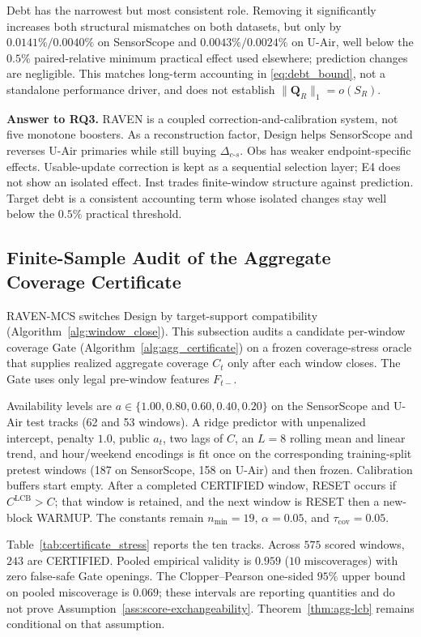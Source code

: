 \documentclass[letterpaper,journal]{IEEEtran}
\begin{document}
Debt has the narrowest but most consistent role.  Removing it significantly
increases both structural mismatches on both datasets, but only by
$0.0141\%/0.0040\%$ on SensorScope and
$0.0043\%/0.0024\%$ on U-Air, well below the $0.5\%$ paired-relative
minimum practical effect used elsewhere; prediction changes are negligible.
This matches long-term accounting in \eqref{eq:debt_bound}, not a
standalone performance driver, and does not establish
$\|\mathbf Q_R\|_1=o(S_R)$.

\noindent\textbf{Answer to RQ3.}
RAVEN is a coupled correction-and-calibration system, not five monotone
boosters.  As a reconstruction factor, Design helps SensorScope and
reverses U-Air primaries while still buying $\Delta_{c\text{-}s}$.
Obs has weaker endpoint-specific effects.  Usable-update correction is
kept as a sequential selection layer; E4 does not show an isolated
effect.  Inst trades finite-window structure against prediction.
Target debt is a consistent accounting term whose isolated changes stay
well below the $0.5\%$ practical threshold.

\subsection{Finite-Sample Audit of the Aggregate Coverage Certificate}
\label{subsec:eval_certificate}

RAVEN-MCS switches Design by target-support compatibility
(Algorithm~\ref{alg:window_close}).  This subsection audits a candidate
per-window coverage Gate (Algorithm~\ref{alg:agg_certificate}) on a frozen
coverage-stress oracle that supplies realized aggregate coverage $C_t$
only after each window closes.  The Gate uses only legal pre-window
features $F_{t-}$.

Availability levels are $a\in\{1.00,0.80,0.60,0.40,0.20\}$ on the
SensorScope and U-Air test tracks (62 and 53 windows).  A ridge predictor
with unpenalized intercept, penalty $1.0$, public $a_t$, two lags of $C$,
an $L=8$ rolling mean and linear trend, and hour/weekend encodings is
fit once on the corresponding training-split pretest windows (187 on
SensorScope, 158 on U-Air) and then frozen.  Calibration buffers start
empty.  After a completed CERTIFIED window, RESET occurs if
$C^{\mathrm{LCB}}>C$; that window is retained, and the next window is
RESET then a new-block WARMUP.  The constants remain $n_{\min}=19$,
$\alpha=0.05$, and $\tau_{\mathrm{cov}}=0.05$.

Table~\ref{tab:certificate_stress} reports the ten tracks.
Across $575$ scored windows, $243$ are CERTIFIED.  Pooled empirical
validity is $0.959$ ($10$ miscoverages) with zero false-safe Gate
openings.  The Clopper--Pearson one-sided $95\%$ upper bound on pooled
miscoverage is $0.069$; these intervals are reporting quantities and do
not prove Assumption~\ref{ass:score-exchangeability}.
Theorem~\ref{thm:agg-lcb} remains conditional on that assumption.
\end{document}
